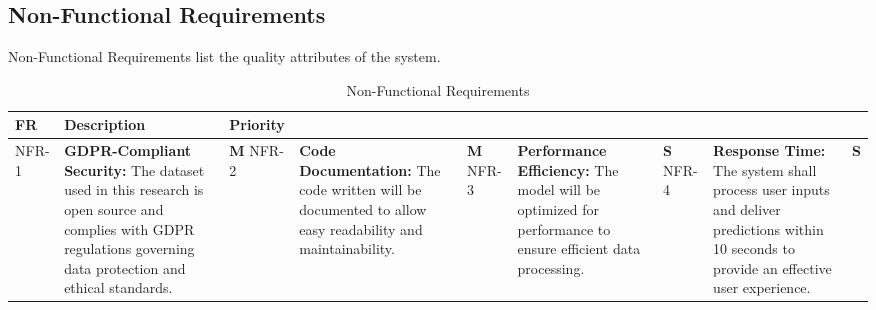 \subsection{Non-Functional Requirements}
Non-Functional Requirements list the quality attributes of the system.
\vspace{-0.25cm}
\begin{longtable}{|p{2.5cm}|p{9cm}|p{2cm}|}
\hline
\textbf{FR} & \textbf{Description} & \textbf{Priority} \\
\hline
NFR-1 & \textbf{GDPR-Compliant Security: }
The dataset used in this research is open source and complies with GDPR regulations governing data protection and ethical standards. & \textbf{M} 
\hline
NFR-2 & \textbf{Code Documentation: }
The code written will be documented to allow easy readability and maintainability.  & \textbf{M}
\hline
NFR-3 & \textbf{Performance Efficiency: }
The model will be optimized for performance to ensure efficient data processing. & \textbf{S} 
\hline
NFR-4 & \textbf{Response Time: }
The system shall process user inputs and deliver predictions within 10 seconds to provide an effective user experience. & \textbf{S} 
\hline
\caption{Non-Functional Requirements}
\end{longtable}
\vspace{1cm}
